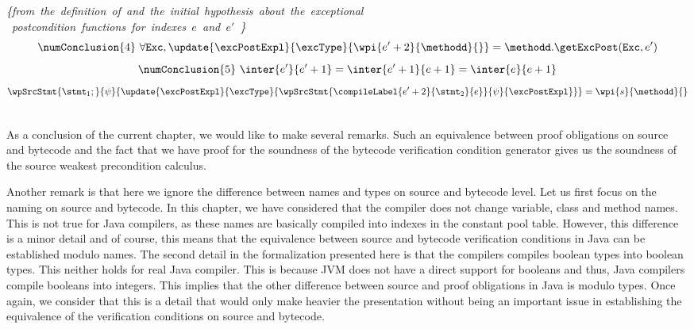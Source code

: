 \begin{description}
	      \mbox{\rm\textit{\{from the definition of \getExcPost{} and  the initial hypothesis about the exceptional }}\\
	      \mbox{\rm\textit{  postcondition functions for indexes $e$ and $e' $ \}}}
	    	     $$ \numConclusion{4} \ \forall \mbox{\rm\texttt{Exc}} ,  \update{\excPostExpl}{\excType}{ \wpi{e'+2}{\methodd}{} } = 
                  \methodd.\getExcPost(\mbox{\rm\texttt{Exc}}, e' )$$
	     $$ \numConclusion{5} \ \inter{e'}{e' + 1} = \inter{e'+1 }{e + 1} = \inter{e}{e+1}$$
	      $$ \wpSrcStmt{\stmt_1; }
                         {  \psi}
			 {  \update{\excPostExpl}{\excType}{ \wpSrcStmt{\compileLabel{e'+2}{\stmt_2}{e} }{\psi}{\excPostExpl }} } =
			  \wpi{s}{\methodd}{}$$
	      
	   
\end{description}
\Qed \\

As a conclusion of the current chapter, we would like to make several remarks. 
Such an equivalence between proof obligations on source and bytecode and the fact that
we have proof for the soundness of the bytecode verification condition generator
 gives us the soundness of the source  weakest precondition calculus.  

Another remark is that here we ignore the difference between names and types on  source and bytecode level. 
Let us first focus on the naming on source and bytecode. 
In this chapter, we have considered that the compiler  does not change  variable, class and method  names.
 This is not true for Java compilers, as these names are basically compiled into 
indexes in the constant pool table. However, this difference is a minor detail and of course, this means that 
the equivalence between source and bytecode verification conditions in Java can be established modulo names.
The second detail in the formalization presented here is that the compilers compiles boolean types into boolean types.
This neither holds for real Java compiler. This is because JVM does not have a direct support  for booleans and thus,
Java compilers compile booleans into integers. This implies that the other difference between source and proof
obligations in Java is modulo types. Once again, we consider that this is a detail that would only make heavier
the presentation without being an important issue in establishing the equivalence of the verification conditions on source and bytecode. 
